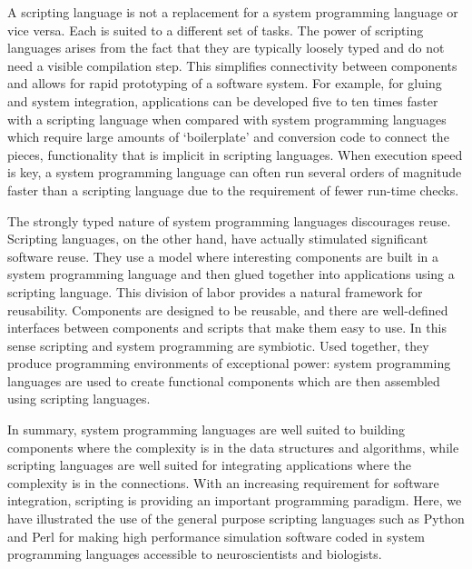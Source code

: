 \documentclass[12pt]{article}
\begin{document}

A scripting language is not a replacement for a system programming
language or vice versa. Each is suited to a different set of tasks. The power of scripting languages arises from the fact that they are typically loosely typed and do not need a
visible compilation step. This simplifies connectivity between components
and allows for rapid prototyping of a software system.
For example, for gluing and system integration, applications can be developed
five to ten times faster with a scripting language when compared with system programming languages which
require large amounts of `boilerplate' and conversion code to connect
the pieces, functionality that is implicit in scripting languages. When
execution speed is key, a system programming language can often run
several orders of magnitude faster than a scripting language due to the requirement of
fewer run-time checks.

The strongly typed nature of system programming languages discourages
reuse. Scripting languages, on the other hand, have actually
stimulated significant software reuse. They use a model where
interesting components are built in a system programming language and
then glued together into applications using a scripting language.
This division of labor provides a natural framework for reusability.
Components are designed to be reusable, and there are well-defined
interfaces between components and scripts that make them easy to use.
In this sense scripting and system programming are symbiotic. Used
together, they produce programming environments of exceptional power:
system programming languages are used to create functional components
which are then assembled using scripting languages.

In summary, system programming languages are well suited to building
components where the complexity is in the data structures and
algorithms, while scripting languages are well suited for integrating
applications where the complexity is in the connections. With an
increasing requirement for software integration, scripting is
providing an important programming paradigm.  Here, we have
illustrated the use of the general purpose scripting languages such as
Python and Perl for making high performance simulation software coded
in system programming languages accessible to neuroscientists and
biologists.
\end{document}
